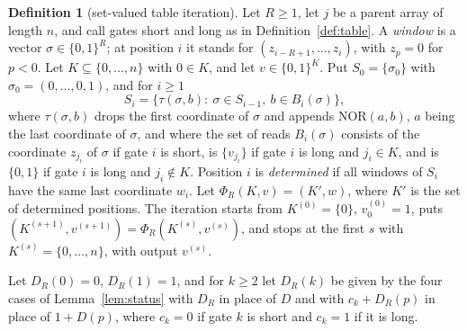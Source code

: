 \documentclass[11pt]{amsart}
\theoremstyle{definition}
\newtheorem{definition}[theorem]{Definition}
\theoremstyle{remark}
\newcommand{\NOR}{\mathrm{NOR}}
\begin{document}
\begin{definition}[set-valued table iteration]\label{def:setval}
Let $R\ge1$, let $j$ be a parent array of length $n$, and call gates short and long as in
Definition~\ref{def:table}. A \emph{window} is a vector $\sigma\in\{0,1\}^R$; at position $i$ it
stands for $(z_{i-R+1},\dots,z_i)$, with $z_p=0$ for $p<0$. Let $K\subseteq\{0,\dots,n\}$ with
$0\in K$, and let $v\in\{0,1\}^K$. Put $S_0=\{\sigma_0\}$ with $\sigma_0=(0,\dots,0,1)$, and for
$i\ge1$
\[
S_i=\bigl\{\tau(\sigma,b):\ \sigma\in S_{i-1},\ b\in B_i(\sigma)\bigr\},
\]
where $\tau(\sigma,b)$ drops the first coordinate of $\sigma$ and appends $\NOR(a,b)$, $a$ being
the last coordinate of $\sigma$, and where the set of reads $B_i(\sigma)$ consists of the
coordinate $z_{j_i}$ of $\sigma$ if gate $i$ is short, is $\{v_{j_i}\}$ if gate $i$ is long and
$j_i\in K$, and is $\{0,1\}$ if gate $i$ is long and $j_i\notin K$. Position $i$ is
\emph{determined} if all windows of $S_i$ have the same last coordinate $w_i$. Let
$\Phi_R(K,v)=(K',w)$, where $K'$ is the set of determined positions. The iteration starts from
$K^{(0)}=\{0\}$, $v^{(0)}_0=1$, puts $(K^{(s+1)},v^{(s+1)})=\Phi_R(K^{(s)},v^{(s)})$, and stops at
the first $s$ with $K^{(s)}=\{0,\dots,n\}$, with output $v^{(s)}$.

Let $D_R(0)=0$, $D_R(1)=1$, and for $k\ge2$ let $D_R(k)$ be given by the four cases of
Lemma~\ref{lem:status} with $D_R$ in place of $D$ and with $c_k+D_R(p)$ in place of $1+D(p)$,
where $c_k=0$ if gate $k$ is short and $c_k=1$ if it is long.
\end{definition}
\end{document}
